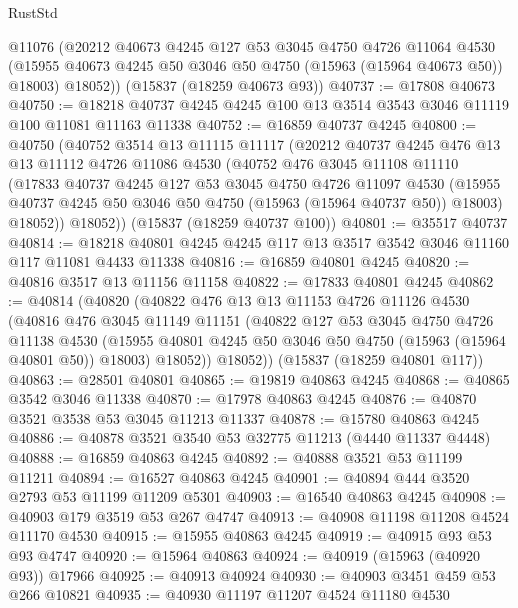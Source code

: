 \begin{lexlean}{RustStd}
\begin{coremodule}
      @11076
      (@20212
        @40673
        @4245
        @127
        @53
        @3045
        @4750
        @4726
        @11064
        @4530
        (@15955 @40673 @4245 @50 @3046 @50 @4750 (@15963 (@15964 @40673 @50)) @18003)
        @18052))
    (@15837 (@18259 @40673 @93))
@40737 := @17808 @40673
@40750 := @18218 @40737 @4245 @4245 @100 @13 @3514 @3543 @3046 @11119 @100 @11081 @11163 @11338
@40752 := @16859 @40737 @4245
@40800 := @40750
    (@40752
      @3514
      @13
      @11115
      @11117
      (@20212
        @40737
        @4245
        @476
        @13
        @13
        @11112
        @4726
        @11086
        @4530
        (@40752
          @476
          @3045
          @11108
          @11110
          (@17833
            @40737
            @4245
            @127
            @53
            @3045
            @4750
            @4726
            @11097
            @4530
            (@15955 @40737 @4245 @50 @3046 @50 @4750 (@15963 (@15964 @40737 @50)) @18003)
            @18052))
        @18052))
    (@15837 (@18259 @40737 @100))
@40801 := @35517 @40737
@40814 := @18218 @40801 @4245 @4245 @117 @13 @3517 @3542 @3046 @11160 @117 @11081 @4433 @11338
@40816 := @16859 @40801 @4245
@40820 := @40816 @3517 @13 @11156 @11158
@40822 := @17833 @40801 @4245
@40862 := @40814
    (@40820
      (@40822
        @476
        @13
        @13
        @11153
        @4726
        @11126
        @4530
        (@40816
          @476
          @3045
          @11149
          @11151
          (@40822
            @127
            @53
            @3045
            @4750
            @4726
            @11138
            @4530
            (@15955 @40801 @4245 @50 @3046 @50 @4750 (@15963 (@15964 @40801 @50)) @18003)
            @18052))
        @18052))
    (@15837 (@18259 @40801 @117))
@40863 := @28501 @40801
@40865 := @19819 @40863 @4245
@40868 := @40865 @3542 @3046 @11338
@40870 := @17978 @40863 @4245
@40876 := @40870 @3521 @3538 @53 @3045 @11213 @11337
@40878 := @15780 @40863 @4245
@40886 := @40878 @3521 @3540 @53 @32775 @11213 (@4440 @11337 @4448)
@40888 := @16859 @40863 @4245
@40892 := @40888 @3521 @53 @11199 @11211
@40894 := @16527 @40863 @4245
@40901 := @40894 @444 @3520 @2793 @53 @11199 @11209 @5301
@40903 := @16540 @40863 @4245
@40908 := @40903 @179 @3519 @53 @267 @4747
@40913 := @40908 @11198 @11208 @4524 @11170 @4530
@40915 := @15955 @40863 @4245
@40919 := @40915 @93 @53 @93 @4747
@40920 := @15964 @40863
@40924 := @40919 (@15963 (@40920 @93)) @17966
@40925 := @40913 @40924
@40930 := @40903 @3451 @459 @53 @266 @10821
@40935 := @40930 @11197 @11207 @4524 @11180 @4530

\end{coremodule}
\end{lexlean}
